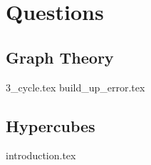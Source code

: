 \documentclass{exam}
\begin{document}
\clearpage 

\section{Questions}
\subsection{Graph Theory}
\begin{enumerate}
{3_cycle.tex}
{build_up_error.tex}
\end{enumerate}

\subsection{Hypercubes}
\begin{enumerate}
{introduction.tex}
\end{enumerate}
\end{document}
